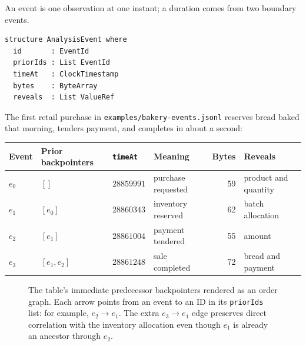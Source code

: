 An event is one observation at one instant; a duration comes from two boundary
events.

\begin{lstlisting}
structure AnalysisEvent where
  id       : EventId
  priorIds : List EventId
  timeAt   : ClockTimestamp
  bytes    : ByteArray
  reveals  : List ValueRef
\end{lstlisting}

The first retail purchase in \texttt{examples/bakery-events.jsonl} reserves bread
baked that morning, tenders payment, and completes in about a second:

\begin{center}
\small
\begin{tabular}{@{}llllrl@{}}
\toprule
Event & Prior backpointers & \texttt{timeAt} & Meaning & Bytes & Reveals \\
\midrule
$e_0$ & $[]$ & $28859991$ & purchase requested & 59 & product and quantity \\
$e_1$ & $[e_0]$ & $28860343$ & inventory reserved & 62 & batch allocation \\
$e_2$ & $[e_1]$ & $28861004$ & payment tendered & 55 & amount \\
$e_3$ & $[e_1,e_2]$ & $28861248$ & sale completed & 72 & bread and payment \\
\bottomrule
\end{tabular}
\end{center}

\begin{figure}[htbp]
\centering
{}
\caption{The table's immediate predecessor backpointers rendered as an order graph. Each
arrow points from an event to an ID in its \texttt{priorIds} list: for example,
$e_2\to e_1$.  The extra $e_3\to e_1$ edge preserves direct correlation with
the inventory allocation even though $e_1$ is already an ancestor through $e_2$.}
\label{fig:bakery-prior-graph}
\end{figure}

